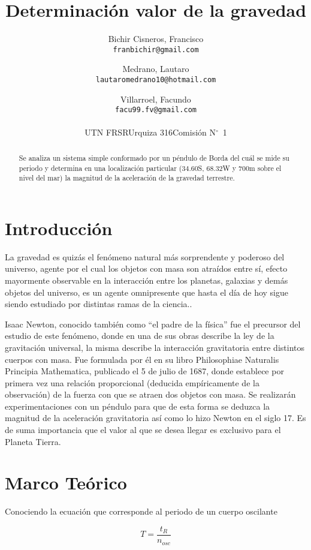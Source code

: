 \documentclass[a4paper,twocolumn]{article}
\title{Determinación valor de la gravedad}
\author{Bichir Cisneros, Francisco\\
\texttt{franbichir@gmail.com}
\and
Medrano, Lautaro\\
\texttt{lautaromedrano10@hotmail.com}\\
\and
Villarroel, Facundo\\
\texttt{facu99.fv@gmail.com}
\\
\\
UTN FRSR\textendash{}Urquiza 316\textendash{}Comisión N$^\circ$~1}
\begin{document}
\maketitle

\begin{abstract}
    Se analiza un sistema simple conformado por un péndulo de Borda\cite{b1} del cuál se mide su periodo\cite{b2} y determina en una localización particular ($34.60$S, $68.32$W y $700$m sobre el nivel del mar) la magnitud de la aceleración de la gravedad terrestre.
\end{abstract}

\section{Introducción}

La gravedad es quizás el fenómeno natural más sorprendente y poderoso del universo\cite{b3}, agente por el cual  los objetos con masa son atraídos entre sí, efecto mayormente observable en la interacción entre los planetas, galaxias y demás objetos del universo, es un agente omnipresente que hasta el día de hoy sigue siendo estudiado por distintas ramas de la ciencia.\cite{b4}.

Isaac Newton\cite{b5}, conocido también como “el padre de la física” fue el precursor del estudio de este fenómeno, donde en una de sus obras describe la ley de la gravitación universal\cite{b6}, la misma describe la interacción gravitatoria entre distintos cuerpos con masa. Fue formulada por él en su libro Philosophiae Naturalis Principia Mathematica\cite{b6}, publicado el 5 de julio de 1687, donde establece por primera vez una relación proporcional (deducida empíricamente de la observación) de la fuerza con que se atraen dos objetos con masa.
Se realizarán experimentaciones con un péndulo para que de esta forma se deduzca la magnitud de la aceleración gravitatoria así como lo hizo Newton en el siglo 17. Es de suma importancia que el valor al que se desea llegar es exclusivo para el Planeta Tierra.\cite{b7}

\section{Marco Teórico}

Conociendo la ecuación que corresponde al periodo de un cuerpo oscilante\cite{b2}

\begin{equation} \label{e3}
    T=\frac{t_{R}}{n_{osc}}
\end{equation}
\end{document}
